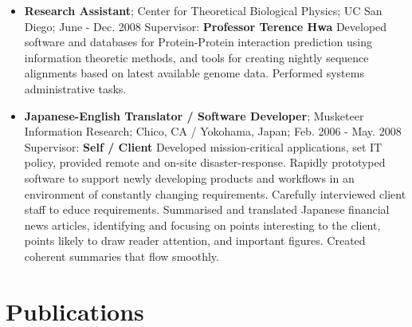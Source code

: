 \begin{itemize}
	\item {\bf Research Assistant}; Center for Theoretical Biological Physics; UC San Diego; June - Dec. 2008
		\subitem Supervisor: {\bf Professor Terence Hwa }
		\subitem Developed software and databases for Protein-Protein interaction prediction using information theoretic methods, and tools for creating nightly sequence alignments based on latest available genome data. Performed systems administrative tasks.
		
	\item {\bf Japanese-English Translator / Software Developer}; Musketeer Information Research; Chico, CA / Yokohama, Japan; Feb. 2006 - May. 2008
		\subitem Supervisor: {\bf Self / Client }
		\subitem Developed mission-critical applications, set IT policy, provided remote and on-site disaster-response. Rapidly prototyped software to support newly developing products and workflows in an environment of constantly changing requirements. Carefully interviewed client staff to educe requirements. Summarised and translated Japanese financial news articles, identifying and focusing on points interesting to the client, points likely to draw reader attention, and important figures. Created coherent summaries that flow smoothly.

\end{itemize}

\section*{Publications}
\nocite{LUNT201017,Lunt393835}
\nocite{Tabe-Bordbar2020.11.08.373555,canby-etal-2020-university,Khajouei2020.02.07.939264}
\nocite{pmid24603210,MorcosE1293,10.1371/journal.pone.0019729}
\renewcommand{\refname}{\vspace*{-1cm}}


%



